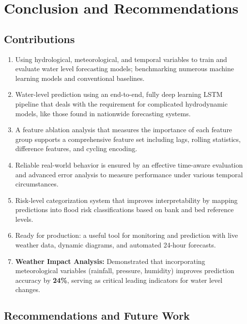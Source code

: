 \setlength{\footskip}{8mm}

\chapter{Conclusion and Recommendations}
\label{ch:conclusion}

\section{Contributions}
\begin{enumerate}
    \item Using hydrological, meteorological, and temporal variables to train and evaluate water level forecasting models; benchmarking numerous machine learning models and conventional baselines.
    \item Water-level prediction using an end-to-end, fully deep learning LSTM pipeline that deals with the requirement for complicated hydrodynamic models, like those found in nationwide forecasting systems.
    \item A feature ablation analysis that measures the importance of each feature group supports a comprehensive feature set including lags, rolling statistics, difference features, and cycling encoding.
    \item Reliable real-world behavior is ensured by an effective time-aware evaluation and advanced error analysis to measure performance under various temporal circumstances.
    \item Risk-level categorization system that improves interpretability by mapping predictions into flood risk classifications based on bank and bed reference levels.
    \item Ready for production: a useful tool for monitoring and prediction with live weather data, dynamic diagrams, and automated 24-hour forecasts.
    \item \textbf{Weather Impact Analysis:} Demonstrated that incorporating meteorological variables (rainfall, pressure, humidity) improves prediction accuracy by \textbf{24\%}, serving as critical leading indicators for water level changes.
\end{enumerate}

\section{Recommendations and Future Work}

